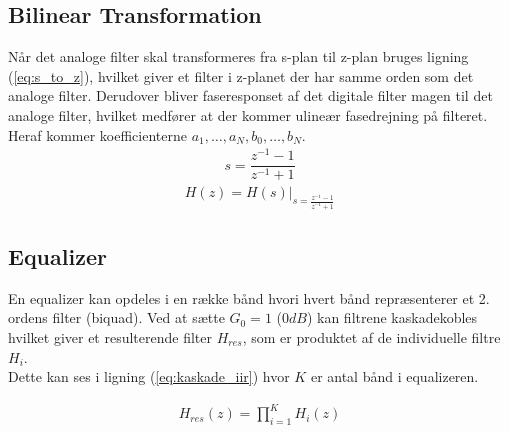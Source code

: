     \subsection{Bilinear Transformation}
    Når det analoge filter skal transformeres fra s-plan til z-plan bruges ligning (\ref{eq:s_to_z}), hvilket giver et 
    filter i z-planet der har samme orden som det analoge filter. Derudover bliver faseresponset af det digitale filter magen til 
    det analoge filter, hvilket medfører at der kommer ulineær fasedrejning på filteret. 
    Heraf kommer koefficienterne $a_1, \dots, a_N, b_0,\dots, b_N $. 
    \begin{align}
    s = \dfrac{z^{-1} - 1}{z^{-1} + 1}  
    \label{eq:s_to_z}
    \end{align}
    \begin{align}
    H(z) = H(s)\big|_{s = \frac{z^{-1} - 1}{z^{-1}+ 1 }}
    \end{align}

    
   \subsection{Equalizer}

   En equalizer kan opdeles i en række bånd hvori hvert bånd repræsenterer et 
   2. ordens filter (biquad). Ved at sætte $G_0 = 1$ ($0 dB$) kan filtrene kaskadekobles hvilket giver 
   et resulterende filter $H_{res}$, som er produktet af de individuelle filtre $H_i$. \\
   Dette kan ses i ligning (\ref{eq:kaskade_iir}) hvor $K$ er antal bånd i equalizeren.  

   \begin{align}
    H_{res}(z) = \prod_{i=1}^{K} H_i(z)
    \label{eq:kaskade_iir}
   \end{align} 




 






